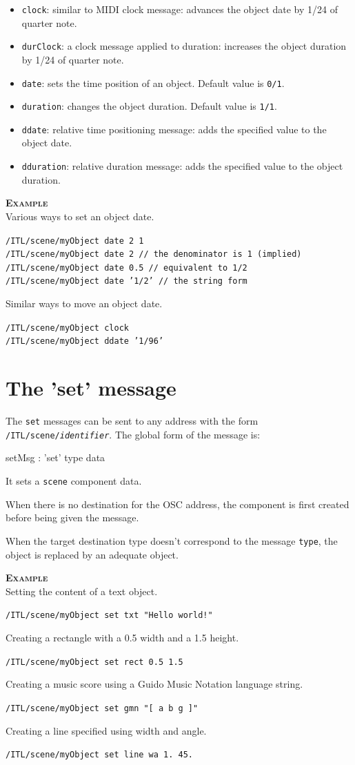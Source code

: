 \documentclass[a4paper,twoside]{report}
\newcommand{\toplevel}[1]	{\chapter{#1}}
\newcommand{\OSC}[1]		{\texttt{#1}}
\newcommand{\values}[1]	{\texttt{#1}}
\newcommand{\example}		{\textbf{\hspace{-1.5cm}\textbf{\textsc{Example }}}}
\newcommand{\sample}	[1]			{\vspace{-2mm}\begin{center}\colorbox{mygrey}{
								\begin{minipage}[t]{0.9\columnwidth} 
								{\small \texttt{#1}}
								\end{minipage}}\end{center}}
\begin{document}
\begin{itemize}
\item \OSC{clock}: similar to MIDI clock message: advances the object date by 1/24 of quarter note.
\item \OSC{durClock}: a clock message applied to duration: increases the object duration by 1/24 of quarter note.
\item \OSC{date}: sets the time position of an object. Default value is \values{0/1}.
\item \OSC{duration}: changes the object duration. Default value is \values{1/1}.
\item \OSC{ddate}: relative time positioning message: adds the specified value to the object date.
\item \OSC{dduration}: relative duration message: adds the specified value to the object duration.
\end{itemize}


\example \\
Various ways to set an object date.
\sample{/ITL/scene/myObject date 2 1 \\
/ITL/scene/myObject date 2     \hspace{1.2cm}// the denominator is 1 (implied) \\
/ITL/scene/myObject date 0.5   \hspace{7mm} // equivalent to 1/2 \\
/ITL/scene/myObject date '1/2' \hspace{4mm} // the string form
}
Similar ways to move an object date.
\sample{/ITL/scene/myObject clock   \\
/ITL/scene/myObject ddate '1/96'
}


\toplevel{The 'set' message}
\label{setsect}
The \OSC{set} messages can be sent to any address with the form \OSC{/ITL/scene/\textit{identifier}}. The global form of the message is:

\begin{rail}
setMsg : 'set' type data
\end{rail}

It sets a \OSC{scene} component data. 

When there is no destination for the OSC address, the component is first created before being given the message. 

When the target destination type doesn't correspond to the message \OSC{type}, the object is replaced by an adequate object.

\example \\
Setting the content of a text object.
\sample{/ITL/scene/myObject set txt "Hello world!"}
Creating a rectangle with a 0.5 width and a 1.5 height.
\sample{/ITL/scene/myObject set rect 0.5 1.5}
Creating a music score using a Guido Music Notation language string.
\sample{/ITL/scene/myObject set gmn "[ a b g ]"}
Creating a line specified using width and angle.
\sample{/ITL/scene/myObject set line wa 1. 45.}
\end{document}
